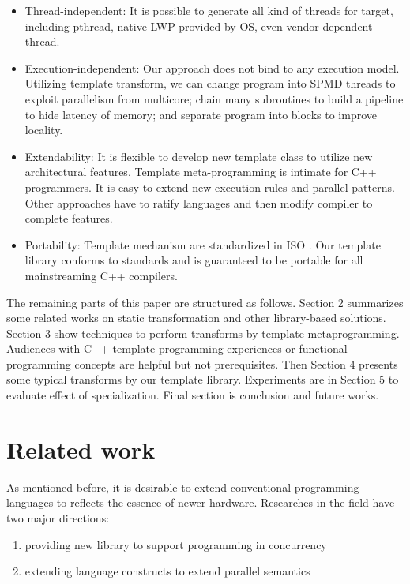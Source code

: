 \documentclass[10pt, conference, compsocconf]{IEEEtran}
\begin{document}
\begin{itemize}
\item Thread-independent: It is possible to generate all kind of threads for target, including pthread, native LWP provided by OS, even vendor-dependent thread. 

\item Execution-independent: Our approach does not bind to any execution model. Utilizing template transform, we can change program into SPMD threads to exploit parallelism from multicore; chain many subroutines to build a pipeline to hide latency of memory; and separate program into blocks to improve locality. 

\item Extendability:  It is flexible to develop new template class to utilize new architectural features. Template meta-programming is intimate for C++ programmers. It is easy to extend new execution rules and parallel patterns. Other approaches have to ratify languages and then modify compiler to complete features.

\item Portability: Template mechanism are standardized in ISO \cite{b8, b17}. Our template library conforms to standards and is guaranteed to be portable for all mainstreaming C++ compilers.
\end{itemize}

The remaining parts of this paper are structured as follows. Section 2 summarizes some related works on static transformation and other library-based solutions. Section 3 show techniques to perform transforms by template metaprogramming. Audiences with C++ template programming experiences or functional programming concepts are helpful but not prerequisites. Then Section 4 presents some typical transforms by our template library. Experiments are in Section 5 to evaluate effect of specialization. Final section is conclusion and future works.

\section{Related work}
As mentioned before, it is desirable to extend conventional programming languages to reflects the essence of newer hardware. Researches in the field have two major directions:
\begin{enumerate}
\item providing new library to support programming in concurrency
\item extending language constructs to extend parallel semantics
\end{enumerate}
\end{document}
